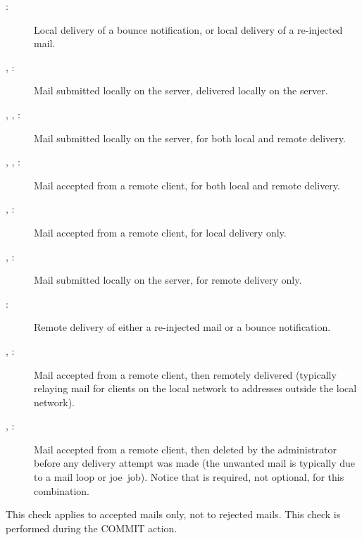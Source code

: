 \begin{description}

    \item [:] Local delivery of a bounce notification, or
        local delivery of a re-injected mail.

    \item [, :] Mail submitted locally on the
        server, delivered locally on the server.

    \item [, , :] Mail submitted
        locally \newline{} on the server, for both local and remote
        delivery.

    \item [, , :] Mail accepted
        from a remote client, for both local and remote delivery.

    \item [, :] Mail accepted from a remote
        client, for local delivery only.

    \item [, :] Mail submitted locally on the
        server, for remote delivery only.

    \item [:] Remote delivery of either a re-injected mail or
        a bounce notification.

    \item [, :] Mail accepted from a remote
        client, then remotely delivered (typically relaying mail for
        clients on the local network to addresses outside the local
        network).

    \item [, :] Mail accepted from a remote
        client, then deleted by the administrator before any delivery
        attempt was made (the unwanted mail is typically due to a mail loop
        or joe~job).  Notice that  is
        required, not optional, for this combination.

\end{description}

This check applies to accepted mails only, not to rejected mails.  This
check is performed during the COMMIT action.


